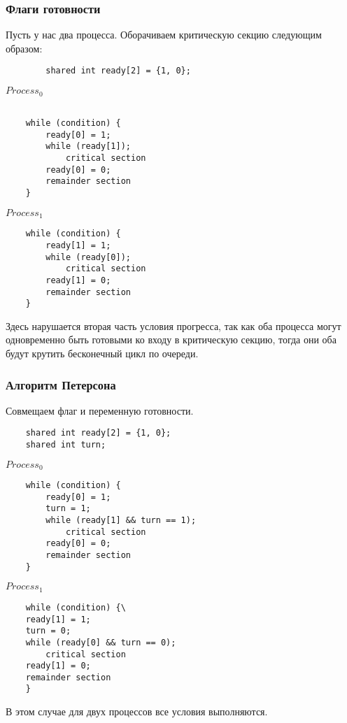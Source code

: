 \documentclass[12pt, a4paper]{article}
\begin{document}
    \subsubsection*{Флаги готовности}
    Пусть у нас два процесса. Оборачиваем критическую секцию следующим образом:
    \begin{lstlisting}
        shared int ready[2] = {1, 0};
    \end{lstlisting}
    $Process_0$
    \begin{lstlisting}
        
    while (condition) {
        ready[0] = 1;
        while (ready[1]);
            critical section
        ready[0] = 0;
        remainder section
    }
    \end{lstlisting}
    $Process_1$
    \begin{lstlisting}
    while (condition) {
        ready[1] = 1;
        while (ready[0]);
            critical section
        ready[1] = 0;
        remainder section
    }
    \end{lstlisting}
    Здесь нарушается вторая часть условия прогресса, так как оба процесса могут одновременно быть готовыми ко входу в критическую секцию, тогда они оба будут крутить бесконечный цикл по очереди.
    \subsubsection*{Алгоритм Петерсона}
    Совмещаем флаг и переменную готовности.
    \begin{lstlisting}
    shared int ready[2] = {1, 0};
    shared int turn;
    \end{lstlisting}
    $Process_0$
    \begin{lstlisting}
    while (condition) {
        ready[0] = 1;
        turn = 1;
        while (ready[1] && turn == 1);
            critical section
        ready[0] = 0;
        remainder section
    }
    \end{lstlisting}
    $Process_1$
    \begin{lstlisting}
    while (condition) {\
    ready[1] = 1;
    turn = 0;
    while (ready[0] && turn == 0);
        critical section
    ready[1] = 0;
    remainder section
    }
    \end{lstlisting}
    В этом случае для двух процессов все условия выполняются.
\end{document}
